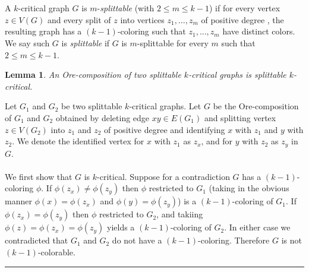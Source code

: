 \documentclass[letterpaper,12pt,oneside,onecolumn]{article}
\newenvironment{proof}{{\bf Proof:  }}{\hfill\rule{2mm}{2mm}}
\newtheorem{lemma}[fact]{Lemma}
\begin{document}
\section{}
A $k$-critical graph $G$ is $m$-\emph{splittable} (with $2\le m \le k-1$) if for every vertex $z\in V(G)$ and every split of $z$ into vertices $z_1,\ldots, z_m$ of positive degree , the resulting graph has a $(k-1)$-coloring such that $z_1, \ldots, z_m$ have distinct colors. We say such $G$ is \emph{splittable} if $G$ is $m$-splittable for every $m$ such that $2\le m \le k-1$.
\begin{lemma}
	An Ore-composition of two splittable $k$-critical graphs is splittable $k$-critical.
\end{lemma}
\begin{proof}
	Let $G_1$ and $G_2$ be two splittable $k$-critical graphs. Let $G$ be the Ore-composition of $G_1$ and $G_2$ obtained by deleting edge $xy \in E(G_1)$ and splitting vertex $z \in V(G_2)$ into $z_1$ and $z_2$ of positive degree and identifying $x$ with $z_1$ and $y$ with $z_2$. We denote the identified vertex for $x$ with $z_1$ as $z_x$, and for $y$ with $z_2$ as $z_y$ in $G$.
	\paragraph{}
	We first show that $G$ is $k$-critical. Suppose for a contradiction $G$ has a $(k-1)$-coloring $\phi$. If $\phi(z_x) \neq \phi(z_y)$ then $\phi$ restricted to $G_1$ (taking in the obvious manner $\phi(x) = \phi(z_x)$ and $\phi(y) = \phi(z_y)$) is a $(k-1)$-coloring of $G_1$. If $\phi(z_x) = \phi(z_y)$ then $\phi$ restricted to $G_2$, and takiing $\phi(z) = \phi(z_x) = \phi(z_y)$ yields a $(k-1)$-coloring of $G_2$. In either case we contradicted that $G_1$ and $G_2$ do not have a $(k-1)$-coloring. Therefore $G$ is not $(k-1)$-colorable.

\end{proof}
\end{document}
